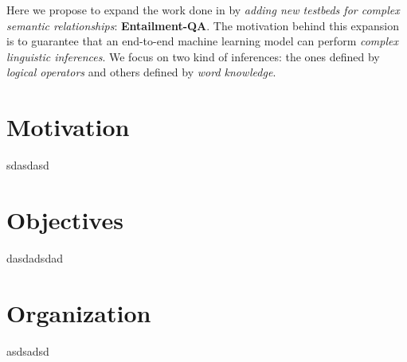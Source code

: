 Here we propose to expand the work done in \cite{BordesW16, WestonBCM15} by \textit{adding new testbeds for complex semantic relationships}: \textbf{Entailment-QA}. The motivation behind this expansion is to guarantee that an end-to-end machine learning model can perform \textit{complex linguistic inferences}. We focus on two kind of inferences: the ones defined by \textit{logical operators} and others defined by \textit{word knowledge}.
\section{Motivation}
\label{sec:motivation}
sdasdasd

\section{Objectives}
\label{sec:objectives}
dasdadsdad
\section{Organization}
\label{sec:organization}
asdsadsd
